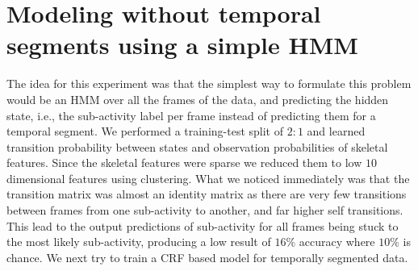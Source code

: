 \documentclass{article} %
\begin{document}
\section{Modeling without temporal segments using a simple HMM}
The idea for this experiment was that the simplest way to formulate this problem would be an HMM over all the frames of the data, and predicting the hidden state, i.e., the sub-activity label per frame instead of predicting them for a temporal segment. We performed a training-test split of $2:1$ and learned transition probability between states and observation probabilities of skeletal features. Since the skeletal features were sparse we reduced them to low $10$ dimensional features using clustering. What we noticed immediately was that the transition matrix was almost an identity matrix as there are very few transitions between frames from one sub-activity to another, and far higher self transitions. This lead to the output predictions of sub-activity for all frames being stuck to the most likely sub-activity, producing a low result of $16\%$ accuracy where $10\%$ is chance. We next try to train a CRF based model for temporally segmented data.


\end{document}
